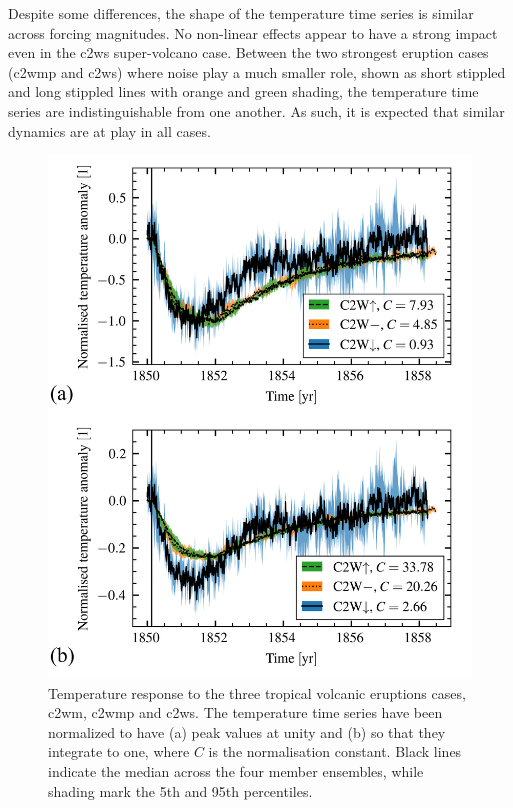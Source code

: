 \documentclass{ametsocV6.1}
\begin{document}
Despite some differences, the shape of the temperature time series is similar across
forcing magnitudes. No non-linear effects appear to have a strong impact even in the
\gls{c2ws} super-volcano case. Between the two strongest eruption cases (\gls{c2wmp} and
\gls{c2ws}) where noise play a much smaller role, shown as short stippled and long
stippled lines with orange and green shading, the temperature time series are
indistinguishable from one another. As such, it is expected that similar dynamics are at
play in all cases.


\begin{figure}
  \centering
  \includegraphics[width=0.95\linewidth]{figures/compare-waveform.png}

  \caption{Temperature response to the three tropical volcanic eruptions cases,
    \gls{c2wm}, \gls{c2wmp} and \gls{c2ws}. The temperature time series have been normalized
    to have (a) peak values at unity and (b) so that they integrate to one, where \(C\) is
    the normalisation constant. Black lines indicate the median across the four member
    ensembles, while shading mark the 5th and 95th percentiles.}\label{fig:compare-waveform}%
\end{figure}
\end{document}
